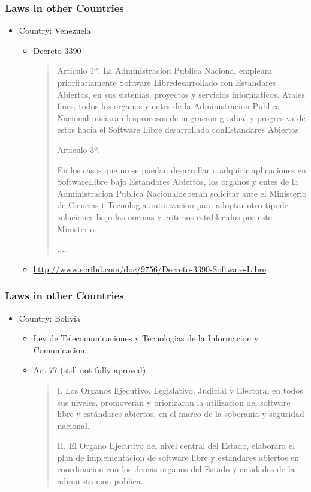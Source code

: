 \documentclass{beamer}
\begin{document}
\begin{frame}
\frametitle{Laws in other Countries}

\begin{itemize}
\item Country: Venezuela
\begin {itemize}

\item Decreto 3390 

\begin {quote}
Articulo 1º.
 La Administracion Publica Nacional empleara prioritariamente Software Libredesarrollado con Estandares Abiertos, en sus sistemas, proyectos y servicios informaticos. Atales fines, todos los organos y entes de la Administracion Publica Nacional iniciaran losprocesos de migracion gradual y progresiva de estos hacia el Software Libre desarrollado conEstandares Abiertos

Articulo 3º.
 
En los casos que no se puedan desarrollar o adquirir aplicaciones en SoftwareLibre bajo Estandares Abiertos, los organos y entes de la Administracion Publica Nacionaldeberan solicitar ante el Ministerio de Ciencias t Tecnologia autorizacion para adoptar otro tipode soluciones bajo las normas y criterios establecidos por este Ministerio

....
\end{quote} 

\item \url{http://www.scribd.com/doc/9756/Decreto-3390-Software-Libre}
\end{itemize}

\end{itemize}

\end{frame}


\begin{frame}
\frametitle{Laws in other Countries}

\begin{itemize}
\item Country: Bolivia
\begin {itemize}

\item Ley de Telecomunicaciones y Tecnologias de la Informacion y Comunicacion. 
\item Art 77 (still not fully aproved) 
\begin{quote}
I. Los Organos Ejecutivo, Legislativo, Judicial y Electoral en todos sus niveles, promoveran y priorizaran la utilizacion del software libre y estándares abiertos, en el marco de la soberania y seguridad nacional.

II. El Organo Ejecutivo del nivel central del Estado, elaborara el plan de implementacion de software libre y estandares abiertos en coordinacion con los demas organos del Estado y entidades de la administracion publica.
\end{quote} 

\end{itemize}

\end{itemize}

\end{frame}
\end{document}
